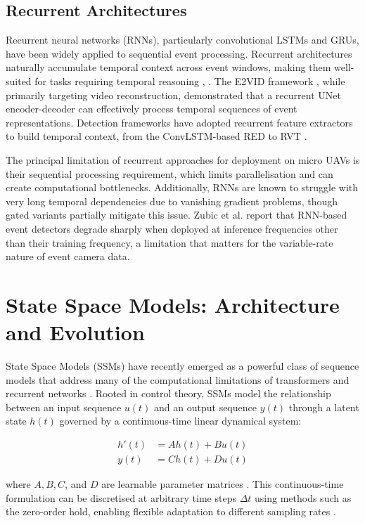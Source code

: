 \documentclass[11pt, a4paper]{report}
\begin{document}
\subsection{Recurrent Architectures}
Recurrent neural networks (RNNs), particularly convolutional LSTMs and GRUs, have been widely applied to sequential event processing. Recurrent architectures naturally accumulate temporal context across event windows, making them well-suited for tasks requiring temporal reasoning \cite{rebecq2019e2vid}, \cite{cannici2019attention}. The E2VID framework \cite{rebecq2019e2vid}, while primarily targeting video reconstruction, demonstrated that a recurrent UNet encoder-decoder can effectively process temporal sequences of event representations. Detection frameworks have adopted recurrent feature extractors to build temporal context, from the ConvLSTM-based RED \cite{perot2020learning} to RVT \cite{gehrig2023recurrent}. 

The principal limitation of recurrent approaches for deployment on micro UAVs is their sequential processing requirement, which limits parallelisation and can create computational bottlenecks. Additionally, RNNs are known to struggle with very long temporal dependencies due to vanishing gradient problems, though gated variants partially mitigate this issue. Zubic et al. \cite{zubic2024state} report that RNN-based event detectors degrade sharply when deployed at inference frequencies other than their training frequency, a limitation that matters for the variable-rate nature of event camera data. 

\section{State Space Models: Architecture and Evolution}
State Space Models (SSMs) have recently emerged as a powerful class of sequence models that address many of the computational limitations of transformers and recurrent networks \cite{gu2022efficiently}. Rooted in control theory, SSMs model the relationship between an input sequence $u(t)$ and an output sequence $y(t)$ through a latent state $h(t)$ governed by a continuous-time linear dynamical system:

\begin{align}
    h'(t) &= Ah(t) + Bu(t) \\
    y(t) &= Ch(t) + Du(t)
\end{align}

where $A, B, C$, and $D$ are learnable parameter matrices \cite{gu2022efficiently}. This continuous-time formulation can be discretised at arbitrary time steps $\Delta t$ using methods such as the zero-order hold, enabling flexible adaptation to different sampling rates \cite{gu2022efficiently, zubic2024state}. 
\end{document}
